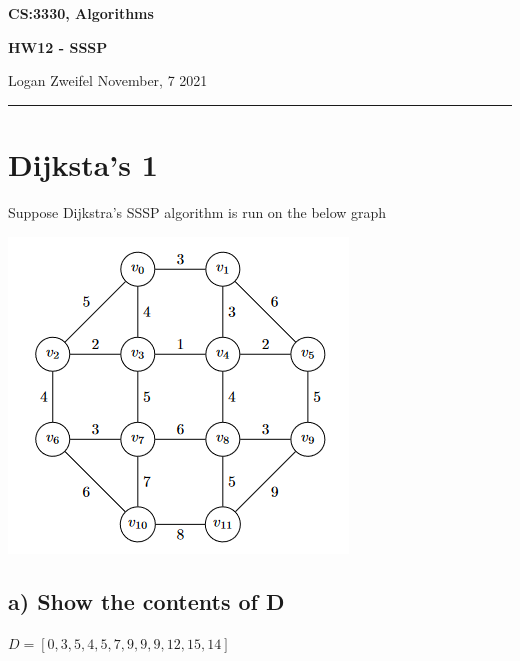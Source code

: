 \documentclass[11pt]{article}
\begin{document}
\thispagestyle{empty}

\begin{center}
\bf\large CS:3330, Algorithms
\end{center}

\begin{center}
\bf\large HW12 - SSSP  %
\end{center}

\noindent
Logan Zweifel     %
\hfill
November, 7 2021           %

\noindent
\rule{\textwidth}{1pt}

\medskip




\section{Dijksta's 1}
Suppose Dijkstra's SSSP algorithm is run on the below graph

\begin{center}
\includegraphics{Q1.png}
\end{center}

\subsection*{a) Show the contents of D}

\bigskip
\bigskip
\begin{center}
$D = [0, 3, 5, 4, 5, 7, 9, 9, 9, 12, 15, 14]$
\end{center}
\end{document}
